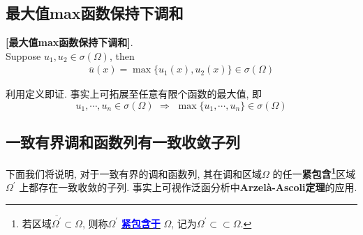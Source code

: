 \vspace*{3em}

\subsection{最大值max函数保持下调和}
	
	\begin{proposition}\label{prop 3.6.1}
		\textbf{[最大值max函数保持下调和]}. \\
		Suppose $u_1 , u_2 \in \sigma(\Omega)$, then 
		\begin{align*}
			\overline{u}(x) = \max \{ u_1(x) , u_2(x) \} \in \sigma(\Omega)
		\end{align*}
		
		\begin{rmk}
			利用定义即证. 事实上可拓展至任意有限个函数的最大值, 即
			\[ u_1 , \cdots , u_n \in \sigma(\Omega) \,\, \Rightarrow \,\, \max\{ u_1 , \cdots , u_n \} \in \sigma(\Omega) \] 
		\end{rmk}
	\end{proposition}

\newpage

\subsection{一致有界调和函数列有一致收敛子列}
	下面我们将说明, 对于一致有界的调和函数列, 其在调和区域$\Omega$ 的任一\textbf{紧包含\footnote{若区域$\overline{\Omega^{'}} \subset \Omega$, 则称$\Omega^{'}$ \underline{\textcolor{blue}{\textbf{紧包含于}}} $\Omega$, 记为$\Omega^{'} \subset\subset \Omega$. }}区域$\Omega^{'}$ 上都存在一致收敛的子列. 事实上可视作泛函分析中\textbf{Arzel\`{a}-Ascoli定理}的应用. 
	
	\vspace*{1em}
	
